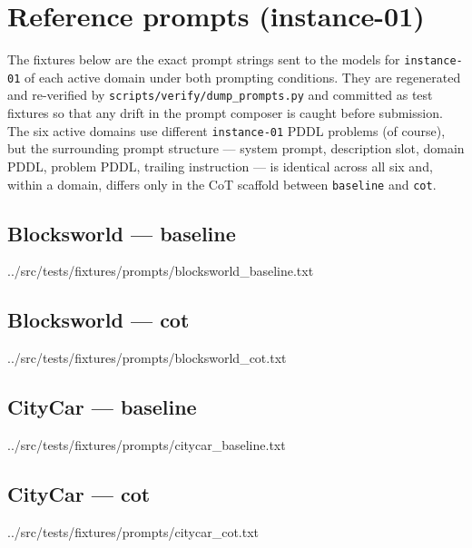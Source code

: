 
\appendix
\section{Reference prompts (instance-01)}
\label{app:prompts}

The fixtures below are the exact prompt strings sent to the models for
\texttt{instance-01} of each active domain under both prompting
conditions. They are regenerated and re-verified by
\texttt{scripts/verify/dump\_prompts.py} and committed as test fixtures
so that any drift in the prompt composer is caught before submission.
The six active domains use different \texttt{instance-01} PDDL problems
(of course), but the surrounding prompt structure --- system prompt,
description slot, domain PDDL, problem PDDL, trailing instruction ---
is identical across all six and, within a domain, differs only in the
CoT scaffold between \texttt{baseline} and \texttt{cot}.

\subsection{Blocksworld --- baseline}

    {../src/tests/fixtures/prompts/blocksworld_baseline.txt}

\subsection{Blocksworld --- cot}

    {../src/tests/fixtures/prompts/blocksworld_cot.txt}

\subsection{CityCar --- baseline}

    {../src/tests/fixtures/prompts/citycar_baseline.txt}

\subsection{CityCar --- cot}

    {../src/tests/fixtures/prompts/citycar_cot.txt}

